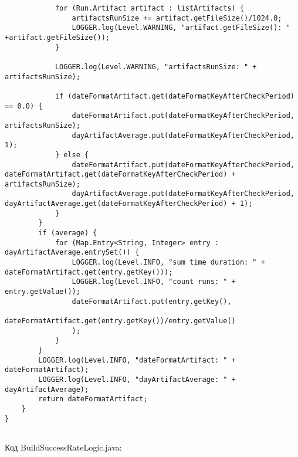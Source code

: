 \begin{lstlisting}
            for (Run.Artifact artifact : listArtifacts) {
                artifactsRunSize += artifact.getFileSize()/1024.0;
                LOGGER.log(Level.WARNING, "artifact.getFileSize(): " +artifact.getFileSize());
            }

            LOGGER.log(Level.WARNING, "artifactsRunSize: " + artifactsRunSize);

            if (dateFormatArtifact.get(dateFormatKeyAfterCheckPeriod) == 0.0) {
                dateFormatArtifact.put(dateFormatKeyAfterCheckPeriod, artifactsRunSize);
                dayArtifactAverage.put(dateFormatKeyAfterCheckPeriod, 1);
            } else {
                dateFormatArtifact.put(dateFormatKeyAfterCheckPeriod, dateFormatArtifact.get(dateFormatKeyAfterCheckPeriod) + artifactsRunSize);
                dayArtifactAverage.put(dateFormatKeyAfterCheckPeriod, dayArtifactAverage.get(dateFormatKeyAfterCheckPeriod) + 1);
            }
        }
        if (average) {
            for (Map.Entry<String, Integer> entry : dayArtifactAverage.entrySet()) {
                LOGGER.log(Level.INFO, "sum time duration: " + dateFormatArtifact.get(entry.getKey()));
                LOGGER.log(Level.INFO, "count runs: " + entry.getValue());
                dateFormatArtifact.put(entry.getKey(),
                        dateFormatArtifact.get(entry.getKey())/entry.getValue()
                );
            }
        }
        LOGGER.log(Level.INFO, "dateFormatArtifact: " + dateFormatArtifact);
        LOGGER.log(Level.INFO, "dayArtifactAverage: " + dayArtifactAverage);
        return dateFormatArtifact;
    }
}


\end{lstlisting}

Код BuildSuccessRateLogic.java:

